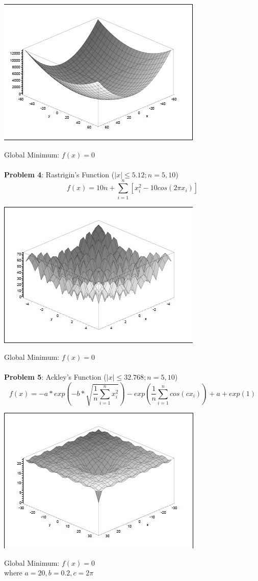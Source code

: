 \documentclass{article}
\begin{document}
\centerline{\includegraphics{tf3}}
Global Minimum: $f(x) = 0$\\\\
\textbf{Problem 4}: Rastrigin's Function ($|x| \leq 5.12; n=5,10$)
\begin{equation}
f(x) = 10n + \sum^n_{i=1}[x_i^2 - 10cos(2\pi x_i)]
\end{equation}
\centerline{\includegraphics{tf4}}
Global Minimum: $f(x) = 0$\\\\
\textbf{Problem 5}: Ackley's Function ($|x| \leq 32.768; n=5,10$)
\begin{equation}
f(x) = -a*exp(-b*\sqrt{\frac{1}{n}\sum^n_{i=1}x_i^2}) - exp(\frac{1}{n}\sum^n_{i=1}cos(cx_i)) + a + exp(1)
\end{equation}
\centerline{\includegraphics{tf6}}
Global Minimum: $f(x) = 0$\\
where $a=20, b=0.2, c = 2\pi$\\\\
\end{document}
